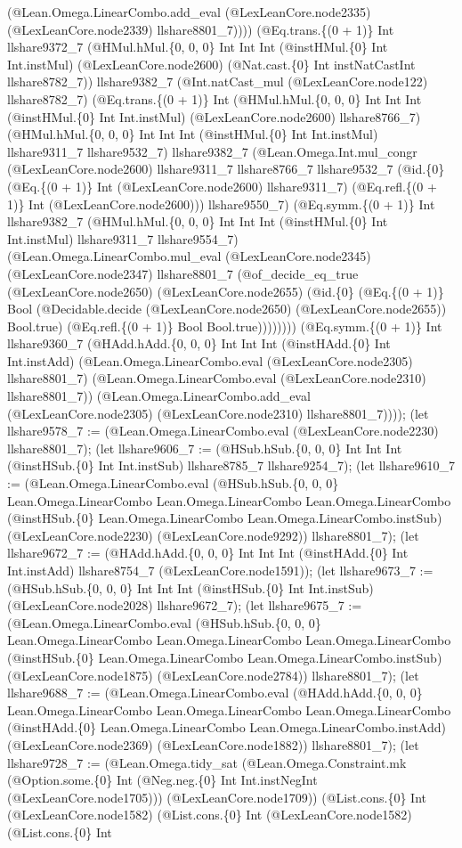 \documentclass[11pt]{article}
\begin{document}
(@Lean.Omega.LinearCombo.add\_eval (@LexLeanCore.node2335) (@LexLeanCore.node2339) llshare8801\_7)))) (@Eq.trans.\{(0 + 1)\} Int llshare9372\_7 (@HMul.hMul.\{0, 0, 0\} Int Int Int (@instHMul.\{0\} Int Int.instMul) (@LexLeanCore.node2600) (@Nat.cast.\{0\} Int instNatCastInt llshare8782\_7)) llshare9382\_7 (@Int.natCast\_mul (@LexLeanCore.node122) llshare8782\_7) (@Eq.trans.\{(0 + 1)\} Int (@HMul.hMul.\{0, 0, 0\} Int Int Int (@instHMul.\{0\} Int Int.instMul) (@LexLeanCore.node2600) llshare8766\_7) (@HMul.hMul.\{0, 0, 0\} Int Int Int (@instHMul.\{0\} Int Int.instMul) llshare9311\_7 llshare9532\_7) llshare9382\_7 (@Lean.Omega.Int.mul\_congr (@LexLeanCore.node2600) llshare9311\_7 llshare8766\_7 llshare9532\_7 (@id.\{0\} (@Eq.\{(0 + 1)\} Int (@LexLeanCore.node2600) llshare9311\_7) (@Eq.refl.\{(0 + 1)\} Int (@LexLeanCore.node2600))) llshare9550\_7) (@Eq.symm.\{(0 + 1)\} Int llshare9382\_7 (@HMul.hMul.\{0, 0, 0\} Int Int Int (@instHMul.\{0\} Int Int.instMul) llshare9311\_7 llshare9554\_7) (@Lean.Omega.LinearCombo.mul\_eval (@LexLeanCore.node2345) (@LexLeanCore.node2347) llshare8801\_7 (@of\_decide\_eq\_true (@LexLeanCore.node2650) (@LexLeanCore.node2655) (@id.\{0\} (@Eq.\{(0 + 1)\} Bool (@Decidable.decide (@LexLeanCore.node2650) (@LexLeanCore.node2655)) Bool.true) (@Eq.refl.\{(0 + 1)\} Bool Bool.true)))))))) (@Eq.symm.\{(0 + 1)\} Int llshare9360\_7 (@HAdd.hAdd.\{0, 0, 0\} Int Int Int (@instHAdd.\{0\} Int Int.instAdd) (@Lean.Omega.LinearCombo.eval (@LexLeanCore.node2305) llshare8801\_7) (@Lean.Omega.LinearCombo.eval (@LexLeanCore.node2310) llshare8801\_7)) (@Lean.Omega.LinearCombo.add\_eval (@LexLeanCore.node2305) (@LexLeanCore.node2310) llshare8801\_7)))); (let llshare9578\_7 := (@Lean.Omega.LinearCombo.eval (@LexLeanCore.node2230) llshare8801\_7); (let llshare9606\_7 := (@HSub.hSub.\{0, 0, 0\} Int Int Int (@instHSub.\{0\} Int Int.instSub) llshare8785\_7 llshare9254\_7); (let llshare9610\_7 := (@Lean.Omega.LinearCombo.eval (@HSub.hSub.\{0, 0, 0\} Lean.Omega.LinearCombo Lean.Omega.LinearCombo Lean.Omega.LinearCombo (@instHSub.\{0\} Lean.Omega.LinearCombo Lean.Omega.LinearCombo.instSub) (@LexLeanCore.node2230) (@LexLeanCore.node9292)) llshare8801\_7); (let llshare9672\_7 := (@HAdd.hAdd.\{0, 0, 0\} Int Int Int (@instHAdd.\{0\} Int Int.instAdd) llshare8754\_7 (@LexLeanCore.node1591)); (let llshare9673\_7 := (@HSub.hSub.\{0, 0, 0\} Int Int Int (@instHSub.\{0\} Int Int.instSub) (@LexLeanCore.node2028) llshare9672\_7); (let llshare9675\_7 := (@Lean.Omega.LinearCombo.eval (@HSub.hSub.\{0, 0, 0\} Lean.Omega.LinearCombo Lean.Omega.LinearCombo Lean.Omega.LinearCombo (@instHSub.\{0\} Lean.Omega.LinearCombo Lean.Omega.LinearCombo.instSub) (@LexLeanCore.node1875) (@LexLeanCore.node2784)) llshare8801\_7); (let llshare9688\_7 := (@Lean.Omega.LinearCombo.eval (@HAdd.hAdd.\{0, 0, 0\} Lean.Omega.LinearCombo Lean.Omega.LinearCombo Lean.Omega.LinearCombo (@instHAdd.\{0\} Lean.Omega.LinearCombo Lean.Omega.LinearCombo.instAdd) (@LexLeanCore.node2369) (@LexLeanCore.node1882)) llshare8801\_7); (let llshare9728\_7 := (@Lean.Omega.tidy\_sat (@Lean.Omega.Constraint.mk (@Option.some.\{0\} Int (@Neg.neg.\{0\} Int Int.instNegInt (@LexLeanCore.node1705))) (@LexLeanCore.node1709)) (@List.cons.\{0\} Int (@LexLeanCore.node1582) (@List.cons.\{0\} Int (@LexLeanCore.node1582) (@List.cons.\{0\} Int 
\end{document}
